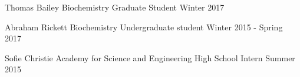 
\begin{cvmentoring}

  \cvmentor
    {Thomas Bailey} %
    {Biochemistry Graduate Student} %
    {Winter 2017} %

  \cvmentor
    {Abraham Rickett} %
    {Biochemistry Undergraduate student} %
    {Winter 2015 - Spring 2017} %

  \cvmentor
    {Sofie Christie} %
    {Academy for Science and Engineering High School Intern} %
    {Summer 2015} %

\end{cvmentoring}
